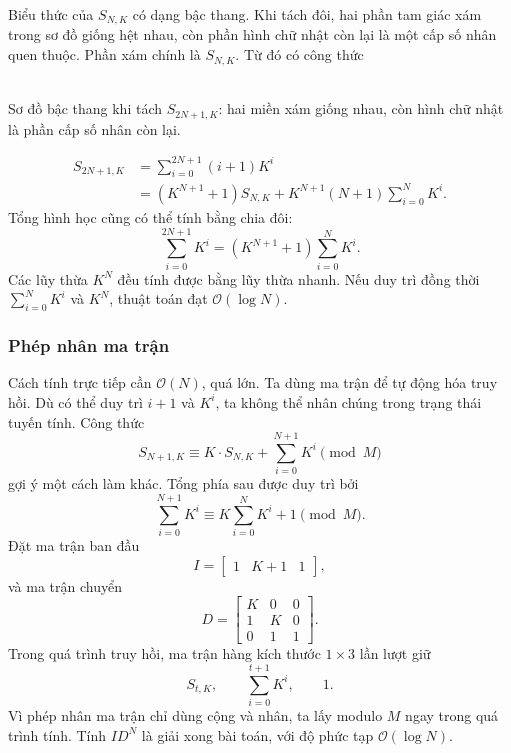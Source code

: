 \documentclass[11pt]{article}
\newcommand{\Oh}{\mathcal{O}}
\begin{document}
Biểu thức của \(S_{N,K}\) có dạng bậc thang. Khi tách đôi, hai phần tam giác
xám trong sơ đồ giống hệt nhau, còn phần hình chữ nhật còn lại là một cấp số
nhân quen thuộc. Phần xám chính là \(S_{N,K}\). Từ đó có công thức

\begin{center}
\\
\small Sơ đồ bậc thang khi tách \(S_{2N+1,K}\): hai miền xám giống nhau,
còn hình chữ nhật là phần cấp số nhân còn lại.
\end{center}

\[
\begin{aligned}
  S_{2N+1,K}
  &=\sum_{i=0}^{2N+1}(i+1)K^i\\
  &=(K^{N+1}+1)S_{N,K}
    +K^{N+1}(N+1)\sum_{i=0}^{N}K^i.
\end{aligned}
\]
Tổng hình học cũng có thể tính bằng chia đôi:
\[
  \sum_{i=0}^{2N+1}K^i=(K^{N+1}+1)\sum_{i=0}^{N}K^i.
\]
Các lũy thừa \(K^N\) đều tính được bằng lũy thừa nhanh. Nếu duy trì đồng thời
\(\sum_{i=0}^{N}K^i\) và \(K^N\), thuật toán đạt \(\Oh(\log N)\).

\subsubsection{Phép nhân ma trận}

Cách tính trực tiếp cần \(\Oh(N)\), quá lớn. Ta dùng ma trận để tự động hóa
truy hồi. Dù có thể duy trì \(i+1\) và \(K^i\), ta không thể nhân chúng trong
trạng thái tuyến tính. Công thức
\[
  S_{N+1,K}\equiv K\cdot S_{N,K}+\sum_{i=0}^{N+1}K^i \pmod M
\]
gợi ý một cách làm khác. Tổng phía sau được duy trì bởi
\[
  \sum_{i=0}^{N+1}K^i\equiv K\sum_{i=0}^{N}K^i+1 \pmod M.
\]
Đặt ma trận ban đầu
\[
  I=\begin{bmatrix}1&K+1&1\end{bmatrix},
\]
và ma trận chuyển
\[
  D=
  \begin{bmatrix}
    K&0&0\\
    1&K&0\\
    0&1&1
  \end{bmatrix}.
\]
Trong quá trình truy hồi, ma trận hàng kích thước \(1\times 3\) lần lượt giữ
\[
  S_{t,K},\qquad \sum_{i=0}^{t+1}K^i,\qquad 1.
\]
Vì phép nhân ma trận chỉ dùng cộng và nhân, ta lấy modulo \(M\) ngay trong
quá trình tính. Tính \(ID^N\) là giải xong bài toán, với độ phức tạp
\(\Oh(\log N)\).
\end{document}
